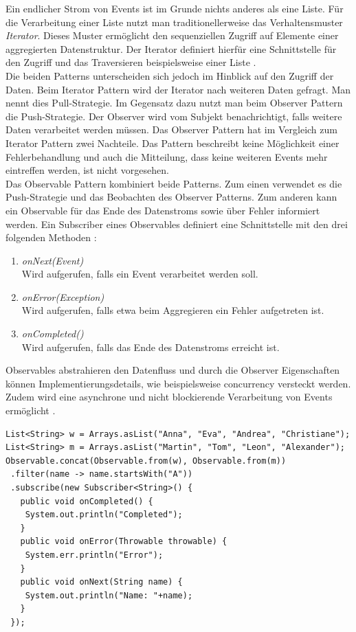 Ein endlicher Strom von Events ist im Grunde nichts anderes als eine Liste. Für die Verarbeitung einer Liste nutzt man traditionellerweise das Verhaltensmuster \textit{Iterator}. Dieses Muster ermöglicht den sequenziellen Zugriff auf Elemente einer aggregierten Datenstruktur. Der Iterator definiert hierfür eine Schnittstelle für den Zugriff und das Traversieren beispielsweise einer Liste \cite[S.~257]{gamma_design_1995}.\\
Die beiden Patterns unterscheiden sich jedoch im Hinblick auf den Zugriff der Daten. Beim Iterator Pattern wird der Iterator nach weiteren Daten gefragt. Man nennt dies Pull-Strategie. Im Gegensatz dazu nutzt man beim Observer Pattern die Push-Strategie. Der Observer wird vom Subjekt benachrichtigt, falls weitere Daten verarbeitet werden müssen. Das Observer Pattern hat im Vergleich zum Iterator Pattern zwei Nachteile. Das Pattern beschreibt keine Möglichkeit einer Fehlerbehandlung und auch die Mitteilung, dass keine weiteren Events mehr eintreffen werden, ist nicht vorgesehen.\\
Das Observable Pattern kombiniert beide Patterns. Zum einen verwendet es die Push-Strategie und das Beobachten des Observer Patterns. Zum anderen kann ein Observable für das Ende des Datenstroms sowie über Fehler informiert werden. Ein Subscriber eines Observables definiert eine Schnittstelle mit den drei folgenden Methoden \cite{reactivex_2014}:

\begin{enumerate}
\item \textit{onNext(Event)}\\
Wird aufgerufen, falls ein Event verarbeitet werden soll.
\item \textit{onError(Exception)}\\
Wird aufgerufen, falls etwa beim Aggregieren ein Fehler aufgetreten ist.
\item \textit{onCompleted()}\\
Wird aufgerufen, falls das Ende des Datenstroms erreicht ist.
\end{enumerate}

Observables abstrahieren den Datenfluss und durch die Observer Eigenschaften können Implementierungsdetails, wie beispielsweise \gls{concurrency} versteckt werden. Zudem wird eine asynchrone und nicht blockierende Verarbeitung von Events ermöglicht \cite[S.~81]{kuhn_reactive_2015}.

\pagebreak

\begin{lstlisting}[caption={Zusammenknüpfen und filtern zweiter Listen mit RxJava},label={lst:rxjava}]
List<String> w = Arrays.asList("Anna", "Eva", "Andrea", "Christiane");
List<String> m = Arrays.asList("Martin", "Tom", "Leon", "Alexander");
Observable.concat(Observable.from(w), Observable.from(m))
 .filter(name -> name.startsWith("A"))
 .subscribe(new Subscriber<String>() {
   public void onCompleted() {
    System.out.println("Completed");
   }
   public void onError(Throwable throwable) {
    System.err.println("Error");
   }
   public void onNext(String name) {
    System.out.println("Name: "+name);
   }
 });
\end{lstlisting}

